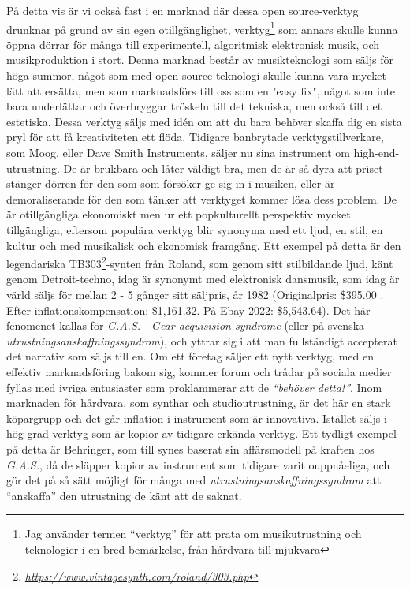 \documentclass{article}
\begin{document}
På detta vis är vi också fast i en marknad där dessa open source-verktyg drunknar på grund av sin egen
otillgänglighet, verktyg\footnote{Jag använder termen ``verktyg'' för att prata om musikutrustning och
teknologier i en bred bemärkelse, från hårdvara till mjukvara} som annars skulle kunna öppna dörrar för många
till experimentell, algoritmisk elektronisk musik, och musikproduktion i stort. Denna marknad består av
musikteknologi som säljs för höga summor, något som med open source-teknologi skulle kunna vara mycket lätt
att ersätta, men som marknadsförs till oss som en "easy fix", något som inte bara underlättar och överbryggar
tröskeln till det tekniska, men också till det estetiska. Dessa verktyg säljs med idén om att du bara behöver
skaffa dig en sista pryl för att få kreativiteten ett flöda. Tidigare banbrytade verktygstillverkare, som
Moog, eller Dave Smith Instruments, säljer nu sina instrument om high-end-utrustning. De är brukbara och låter
väldigt bra, men de är så dyra att priset stänger dörren för den som som försöker ge sig in i musiken, eller
är demoraliserande för den som tänker att verktyget kommer lösa dess problem. De är otillgängliga ekonomiskt
men ur ett popkulturellt perspektiv mycket tillgängliga, eftersom populära verktyg blir synonyma med ett ljud,
en stil, en kultur och med musikalisk och ekonomisk framgång. Ett exempel på detta är den legendariska
TB303\footnote{\emph{\url{https://www.vintagesynth.com/roland/303.php}}}-synten från Roland, som genom sitt
stilbildande ljud, känt genom Detroit-techno, idag är synonymt med elektronisk dansmusik, som idag är värld
säljs för mellan 2 - 5 gånger sitt säljpris, år 1982 (Originalpris: \$395.00 . Efter inflationskompensation:
\$1,161.32. På Ebay 2022: \$5,543.64). Det här fenomenet kallas för \emph{G.A.S.} - \emph{Gear acquisision
syndrome} (eller på svenska \emph{utrustningsanskaffningssyndrom}), och yttrar sig i att man fullständigt
accepterat det narrativ som säljs till en. Om ett företag säljer ett nytt verktyg, med en effektiv
marknadsföring bakom sig, kommer forum och trådar på sociala medier fyllas med ivriga entusiaster som
proklammerar att de \emph{``behöver detta!''}. Inom marknaden för hårdvara, som synthar och studioutrustning,
är det här en stark köpargrupp och det går inflation i instrument som är innovativa. Istället säljs i hög grad
verktyg som är kopior av tidigare erkända verktyg. Ett tydligt exempel på detta är Behringer, som till synes
baserat sin affärsmodell på kraften hos \emph{G.A.S.}, då de släpper kopior av instrument som tidigare varit
ouppnåeliga, och gör det på så sätt möjligt för många med \emph{utrustningsanskaffningssyndrom} att
``anskaffa'' den utrustning de känt att de saknat.
\end{document}
